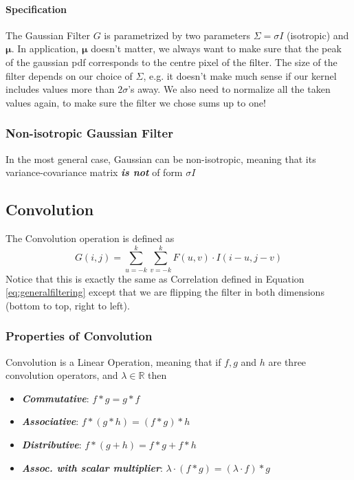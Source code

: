 \documentclass[11pt]{article}
\newcommand{\real}{\mathbb{R}}
\begin{document}
\paragraph{Specification} The Gaussian Filter $G$ is parametrized by two parameters $\Sigma = \sigma I$ (isotropic) and $\boldsymbol{\mu}$. In application, $\boldsymbol{\mu}$ doesn't matter, we always want to make sure that the peak of the gaussian pdf corresponds to the centre pixel of the filter. The size of the filter depends on our choice of $\Sigma$, e.g. it doesn't make much sense if our kernel includes values more than $2\sigma$'s away. We also need to normalize all the taken values again, to make sure the filter we chose sums up to one!

\subsubsection{Non-isotropic Gaussian Filter}
In the most general case, Gaussian can be non-isotropic, meaning that its variance-covariance matrix \textit{\textbf{is not}} of form $\sigma I$ 

\subsection{Convolution}
The Convolution operation is defined as
\begin{equation}
	G(i, j)=\sum_{u=-k}^{k} \sum_{v=-k}^{k} F(u, v) \cdot I(i-u, j-v)
	\label{eq:conv}
\end{equation}
Notice that this is exactly the same as Correlation defined in Equation \ref{eq:generalfiltering} except that we are flipping the filter in both dimensions (bottom to top, right to left). 

\subsubsection{Properties of Convolution}
Convolution is a Linear Operation, meaning that if $f, g$ and $h$ are three convolution operators, and $\lambda \in \real$ then
\begin{itemize}
	\item \textit{\textbf{Commutative}}: $f * g=g * f$
	\item \textit{\textbf{Associative}}: $f *(g * h)=(f * g) * h$
	\item \textit{\textbf{Distributive}}: $f *(g+h)=f * g+f * h$
	\item \textit{\textbf{Assoc. with scalar multiplier}}: $\lambda \cdot(f * g)=(\lambda \cdot f) * g$
\end{itemize}
\end{document}
